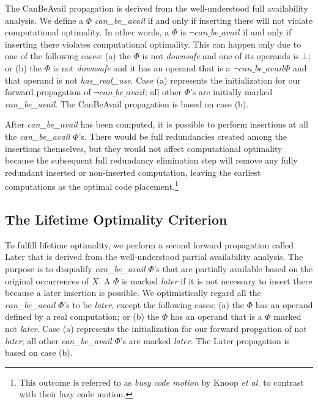The CanBeAvail propagation is derived from the well-understood full 
availability analysis.
We define a $\Phi$ \emph{can\_be\_avail} if and only if inserting there will 
not violate computational optimality.  In other words, a $\Phi$ is 
$\neg can\_be\_avail$ if and only if inserting there violates computational
optimality.  
This can happen only due to one of the following cases: (a) 
the $\Phi$ is not \emph{downsafe} and one of its operands is $\bot$; or (b)
the $\Phi$ is not \emph{downsafe} and it has an operand that is a 
$\neg can\_be\_avail \Phi$ and that operand is not \emph{has\_real\_use}.
Case (a) represents the initialization for our forward propagation of
$\neg can\_be\_avail$; all other $\Phi$'s are initially marked
\emph{can\_be\_avail}.  The CanBeAvail propagation is based on case (b).

After \emph{can\_be\_avail} has been computed, it is possible to perform 
insertions at
all the \emph{can\_be\_avail} $\Phi$'s.  There would be full redundancies
created among the insertions themselves, but they would not affect 
computational optimality because the subsequent full redundancy elimination 
step will remove any fully redundant inserted or non-inserted computation, 
leaving the earliest computations as the optimal code 
placement.\footnote{This outcome is referred to as \emph{busy code motion} 
by Knoop {\it et al.} to contrast with their lazy code motion.}

\subsection{The Lifetime Optimality Criterion}

To fulfill lifetime optimality, we perform a second forward propagation called
Later that is derived from the well-understood partial availability 
analysis.  The purpose is to disqualify \emph{can\_be\_avail} $\Phi$'s that are
partially available based on the original occurrences of $X$.
A $\Phi$ is marked \emph{later} if it is not necessary to insert there because
a later insertion is possible.  We optimistically regard all the
\emph{can\_be\_avail} $\Phi$'s to be \emph{later}, except the following cases:
(a) the $\Phi$ has an operand defined by a real computation; or (b) the $\Phi$
has an operand that is a $\Phi$ marked not \emph{later}.  Case (a) represents
the initialization for our forward propgation of not \emph{later}; all other
\emph{can\_be\_avail} $\Phi$'s are marked \emph{later}.  The Later
propagation is based on case (b).

